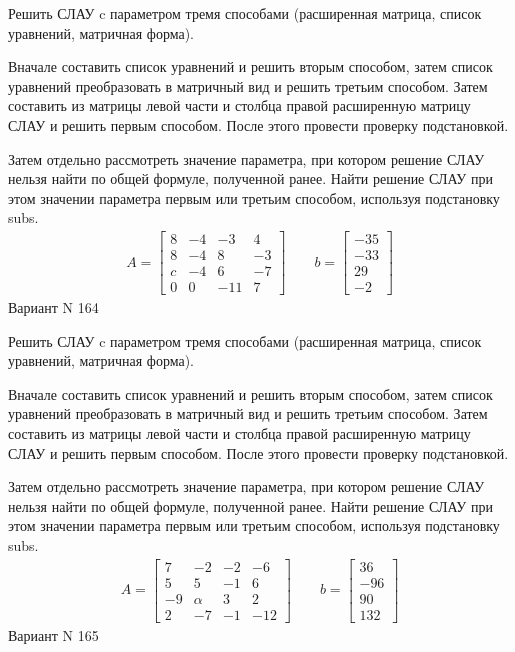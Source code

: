 \documentclass[11pt]{report}
\begin{document}
Решить СЛАУ c параметром тремя способами (расширенная матрица, список уравнений, матричная форма).

Вначале составить список уравнений и решить вторым способом,
затем список уравнений преобразовать в матричный вид и решить третьим способом.
Затем составить из матрицы левой части и столбца правой расширенную матрицу СЛАУ и решить первым способом.
После этого провести проверку подстановкой.

Затем отдельно рассмотреть значение параметра, при котором решение СЛАУ нельзя найти по общей формуле,
полученной ранее.
Найти решение СЛАУ при этом значении параметра первым или третьим способом, используя подстановку subs.
\begin{align*}
    A = \left[\begin{matrix}8 & -4 & -3 & 4\\8 & -4 & 8 & -3\\c & -4 & 6 & -7\\0 & 0 & -11 & 7\end{matrix}\right]
\qquad b = \left[\begin{matrix}-35\\-33\\29\\-2\end{matrix}\right]
\end{align*}
\newpage
Вариант N 164


Решить СЛАУ c параметром тремя способами (расширенная матрица, список уравнений, матричная форма).

Вначале составить список уравнений и решить вторым способом,
затем список уравнений преобразовать в матричный вид и решить третьим способом.
Затем составить из матрицы левой части и столбца правой расширенную матрицу СЛАУ и решить первым способом.
После этого провести проверку подстановкой.

Затем отдельно рассмотреть значение параметра, при котором решение СЛАУ нельзя найти по общей формуле,
полученной ранее.
Найти решение СЛАУ при этом значении параметра первым или третьим способом, используя подстановку subs.
\begin{align*}
    A = \left[\begin{matrix}7 & -2 & -2 & -6\\5 & 5 & -1 & 6\\-9 & \alpha & 3 & 2\\2 & -7 & -1 & -12\end{matrix}\right]
\qquad b = \left[\begin{matrix}36\\-96\\90\\132\end{matrix}\right]
\end{align*}
\newpage
Вариант N 165
\end{document}
